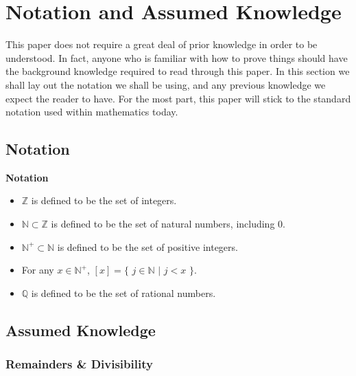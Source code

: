 \documentclass[a4paper,12pt]{article}
\begin{document}
\section{Notation and Assumed Knowledge}
\label{section:notation_and_assumed_knowledge}

\noindent This paper does not require a great deal of prior knowledge in order to be understood. In fact, anyone who is familiar with how to prove things should have the background knowledge required to read through this paper. In this section we shall lay out the notation we shall be using, and any previous knowledge we expect the reader to have. For the most part, this paper will stick to the standard notation used within mathematics today.



\subsection{Notation}
\label{subsection:notation}

\label{notation}
\hypertarget{notation}{}
\begin{tcolorbox}
\textbf{Notation}

\begin{itemize}

\item $\mathbb{Z}$ is defined to be the set of integers.

\item $\mathbb{N} \subset \mathbb{Z}$ is defined to be the set of natural numbers, including $0$.

\item $\mathbb{N}^+ \subset \mathbb{N}$ is defined to be the set of positive integers.

\item For any $x \in \mathbb{N}^+$, $[x] = \{$ $j \in \mathbb{N}$ $|$ $j < x$ $\}$.

\item $\mathbb{Q}$ is defined to be the set of rational numbers.
\end{itemize}
\end{tcolorbox}





\subsection{Assumed Knowledge}
\label{subsection:assumed_knowledge}


\subsubsection{Remainders \& Divisibility}
\label{subsubsection:remainders_and_divisibility}
\end{document}

